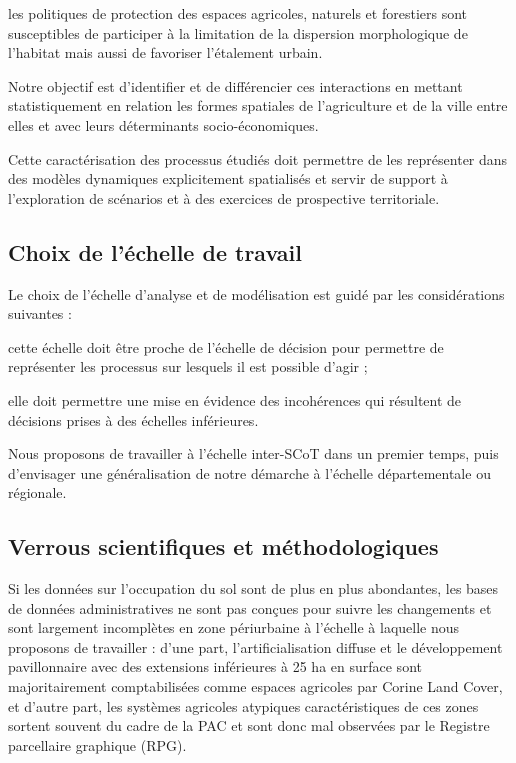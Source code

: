 \item les politiques de protection des espaces agricoles, naturels
     et forestiers sont susceptibles de participer
     à la limitation de la dispersion morphologique de l'habitat
     mais aussi de favoriser l'étalement urbain.

\stopitemize

Notre objectif est d'identifier et de différencier ces interactions
en mettant statistiquement en relation les formes spatiales
de l'agriculture et de la ville entre elles
et avec leurs déterminants socio-économiques.

Cette caractérisation des processus étudiés doit permettre
de les représenter dans des modèles dynamiques explicitement
spatialisés et servir de support à l'exploration de scénarios
et à des exercices de prospective territoriale.


\subsection{Choix de l'échelle de travail}

Le choix de l'échelle d'analyse et de modélisation est guidé
par les considérations suivantes :

\startitemize

\item cette échelle doit être proche de l'échelle de décision
  pour permettre de représenter les processus sur lesquels il est possible
  d'agir ;

\item elle doit permettre une mise en évidence des incohérences
  qui résultent de décisions prises
  à des échelles inférieures.

\stopitemize

Nous proposons de travailler à l'échelle inter-SCoT dans un premier temps,
puis d'envisager une généralisation de notre démarche
à l'échelle départementale ou régionale.


\subsection
{Verrous scientifiques et méthodologiques}

Si les données sur l'occupation du sol sont de plus en plus abondantes,
les bases de données administratives ne sont pas conçues pour
suivre les changements et sont largement incomplètes en zone périurbaine à
l'échelle à laquelle nous proposons de travailler :
d'une part, l'artificialisation diffuse et le développement pavillonnaire
avec des extensions inférieures à 25 ha en surface sont majoritairement
comptabilisées comme espaces agricoles par Corine Land Cover, et d'autre part,
les systèmes agricoles atypiques caractéristiques de ces zones
sortent souvent du cadre de la PAC et sont donc mal
observées par le Registre parcellaire graphique (RPG).

